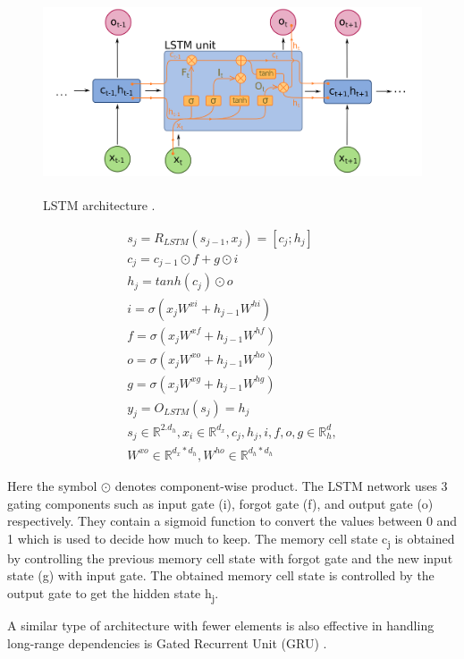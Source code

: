 \documentclass[a4paper, 11pt]{article}
\begin{document}
\begin{figure}[htpb!]
    \centering
    \includegraphics[width=\textwidth,height=6cm,keepaspectratio=true]
    {lstm-1.png}
    \caption{
        LSTM architecture \parencite{rnn-2}.
    }
    \label{fig:LSTM architecture}
\end{figure}

\begin{align*} \label{lstm_equation}
s_j = R_{LSTM}(s_{j-1},x_j) = [c_j;h_j] \\
c_j = c_{j-1} \odot f + g \odot i \\
h_j = tanh(c_j) \odot o \\
i = \sigma(x_jW^{xi} + h_{j-1} W^{hi}) \\
f = \sigma(x_jW^{xf} + h_{j-1} W^{hf}) \\
o = \sigma(x_jW^{xo} + h_{j-1} W^{ho}) \\
g = \sigma(x_jW^{xg} + h_{j-1} W^{hg}) \\
y_j = O_{LSTM}(s_j) = h_j \\
s_j \in \mathbb{R}^{2.d_h},   x_i \in \mathbb{R}^{d_x},  c_j,h_j,i,f,o,g \in \mathbb{R}^d_h, \\
W^{xo} \in \mathbb{R}^{d_x*d_h},  W^{ho} \in \mathbb{R}^{d_h*d_h}
\end{align*}

Here the symbol $\odot$ denotes component-wise product. The LSTM network uses 3 gating components such as input gate (i), forgot gate (f), and output gate (o) respectively. They contain a sigmoid function to convert the values between 0 and 1 which is used to decide how much to keep. The memory cell state c\textsubscript{j} is obtained by controlling the previous memory cell state with forgot gate and the new input state (g) with input gate. The obtained memory cell state is controlled by the output gate to get the hidden state h\textsubscript{j}.

A similar type of architecture with fewer elements is also effective in handling long-range dependencies is Gated Recurrent Unit (GRU) \parencite{cho2014learning}.
\end{document}

